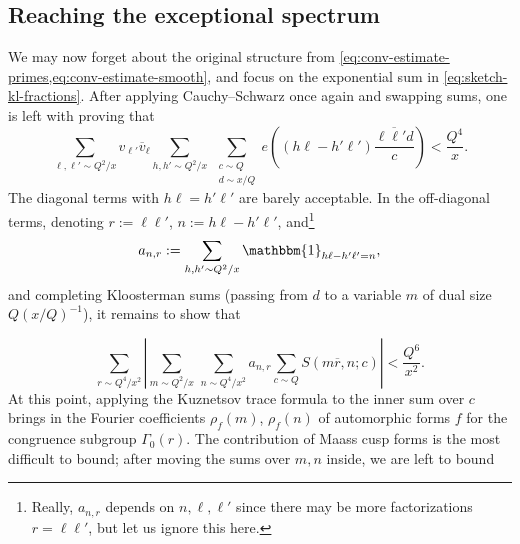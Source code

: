 \documentclass[reqno,11pt]{amsart}
\theoremstyle{remark}
\numberwithin{equation}{section}
\newcommand{\one}{\mathbbm{1}}
\renewcommand{\bar}{\overline}
\begin{document}
\subsection{Reaching the exceptional spectrum} \label{subsec:reaching-exceptional}
We may now forget about the original structure from \cref{eq:conv-estimate-primes,eq:conv-estimate-smooth}, and focus on the exponential sum in \cref{eq:sketch-kl-fractions}.
After applying Cauchy--Schwarz once again and swapping sums, one is left with proving that
\begin{equation} \label{eq:incomplete-kloosterman-overview}
    \sum_{\ell, \ell' \sim Q^2/x} v_{\ell'} \bar v_{\ell} \sum_{h, h' \sim Q^2/x}\ \sum_{\substack{c \sim Q \\ d \sim x/Q}} e\left((h\ell - h'\ell')\frac{\bar{\ell \ell' d}}{c}\right)
    < \frac{Q^4}{x}.
\end{equation}
The diagonal terms with $h\ell = h'\ell'$ are barely acceptable. In the off-diagonal terms, denoting $r := \ell \ell'$, $n := h\ell - h'\ell'$, and\footnote{Really, $a_{n,r}$ depends on $n, \ell, \ell'$ since there may be more factorizations $r = \ell\ell'$, but let us ignore this here.} 
\begin{equation} \label{eq:sketch-special-seq}
    a_{n,r} := \sum_{h, h' \sim Q^2/x} \one_{h\ell - h'\ell' = n},
\end{equation}
and completing Kloosterman sums (passing from $d$ to a variable $m$ of dual size $Q(x/Q)^{-1}$), it remains to show that

\begin{equation} \label{eq:sum-kloosterman-overview}
    \sum_{r \sim Q^4/x^2} \left\vert
    \sum_{m \sim Q^2/x}\,
    \sum_{n \sim Q^4/x^2} a_{n,r} 
    \sum_{c \sim Q}
    S(m \bar{r}, n; c) \right\vert < \frac{Q^6}{x^2}.
\end{equation}
At this point, applying the Kuznetsov trace formula \cite{kuznetsov1980petersson,deshouillers1982kloosterman} to the inner sum over $c$ brings in the Fourier coefficients $\rho_f(m)$, $\rho_f(n)$ of automorphic forms $f$ for the congruence subgroup $\Gamma_0(r)$. The contribution of Maass cusp forms is the most difficult to bound; after moving the sums over $m, n$ inside, we are left to bound
\end{document}
